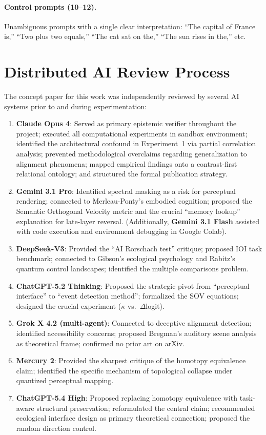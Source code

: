 \documentclass[11pt,a4paper]{article}
\begin{document}
\paragraph{Control prompts (10--12).} Unambiguous prompts with a single clear interpretation: ``The capital of France is,'' ``Two plus two equals,'' ``The cat sat on the,'' ``The sun rises in the,'' etc.

\section{Distributed AI Review Process}
\label{app:parliament}

The concept paper for this work was independently reviewed by several AI systems prior to and during experimentation:

\begin{enumerate}
\item \textbf{Claude Opus 4}: Served as primary epistemic verifier throughout the project; executed all computational experiments in sandbox environment; identified the architectural confound in Experiment~1 via partial correlation analysis; prevented methodological overclaims regarding generalization to alignment phenomena; mapped empirical findings onto a contrast-first relational ontology; and structured the formal publication strategy.
\item \textbf{Gemini 3.1 Pro}: Identified spectral masking as a risk for perceptual rendering; connected to Merleau-Ponty's embodied cognition; proposed the Semantic Orthogonal Velocity metric and the crucial ``memory lookup'' explanation for late-layer reversal. (Additionally, \textbf{Gemini 3.1 Flash} assisted with code execution and environment debugging in Google Colab).
\item \textbf{DeepSeek-V3}: Provided the ``AI Rorschach test'' critique; proposed IOI task benchmark; connected to Gibson's ecological psychology and Rabitz's quantum control landscapes; identified the multiple comparisons problem.
\item \textbf{ChatGPT-5.2 Thinking}: Proposed the strategic pivot from ``perceptual interface'' to ``event detection method''; formalized the SOV equations; designed the crucial experiment ($\kappa$ vs.\ $\Delta$logit).
\item \textbf{Grok X 4.2 (multi-agent)}: Connected to deceptive alignment detection; identified accessibility concerns; proposed Bregman's auditory scene analysis as theoretical frame; confirmed no prior art on arXiv.
\item \textbf{Mercury 2}: Provided the sharpest critique of the homotopy equivalence claim; identified the specific mechanism of topological collapse under quantized perceptual mapping.
\item \textbf{ChatGPT-5.4 High}: Proposed replacing homotopy equivalence with task-aware structural preservation; reformulated the central claim; recommended ecological interface design as primary theoretical connection; proposed the random direction control.
\end{enumerate}
\end{document}
